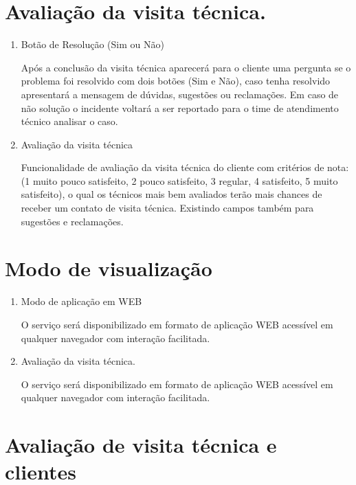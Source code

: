 \documentclass[
    12pt,               %
    openright,          %
    oneside,
    a4paper,            %
    MODELO,             %
    english,            %
    brazil              %
   ]{ifsp-spo-inf-ctds}
\begin{document}
\section{Avaliação da visita técnica.}

	\begin{enumerate}
		
		\item
		Botão de Resolução (Sim ou Não)
		
		Após a conclusão da visita técnica aparecerá para o cliente uma pergunta se o problema foi resolvido com dois botões (Sim e Não), caso tenha resolvido apresentará a mensagem de dúvidas, sugestões ou reclamações. Em caso de não solução o incidente voltará a ser reportado para o time de atendimento técnico analisar o caso. 
		
		\item
		Avaliação da visita técnica
		
		Funcionalidade de avaliação da visita técnica do cliente com critérios de nota:(1 muito pouco satisfeito, 2 pouco satisfeito, 3 regular, 4 satisfeito, 5 muito satisfeito), o qual os técnicos mais bem avaliados terão mais chances de receber um contato de visita técnica. Existindo campos também para sugestões e reclamações.
		
	\end{enumerate}

\section{Modo de visualização}

	\begin{enumerate}
	
		\item
		Modo de aplicação em WEB
		
		O serviço será disponibilizado em formato de aplicação WEB acessível em qualquer navegador com interação facilitada.
		
		\item
		Avaliação da visita técnica.
		
		O serviço será disponibilizado em formato de aplicação WEB acessível em qualquer navegador com interação facilitada.
		
	\end{enumerate}

\section{Avaliação de visita técnica e clientes}
\end{document}
